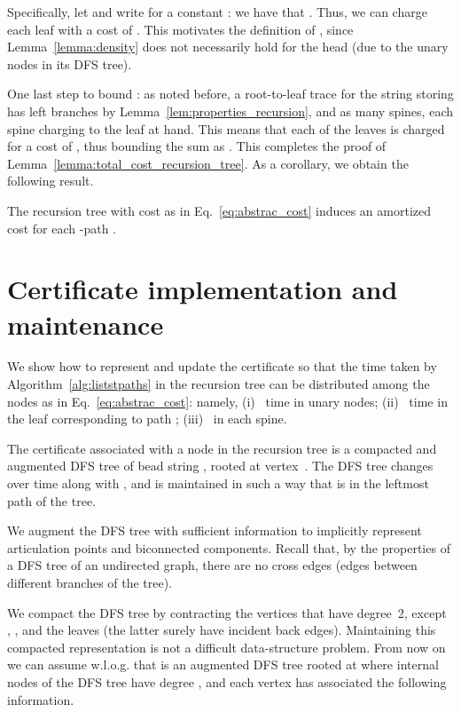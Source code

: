 Specifically, let  and write  for a constant : we have that . Thus, we can charge each
leaf with a cost of . This motivates the
definition of , since Lemma~\ref{lemma:density} does not
necessarily hold for the head  (due to the unary nodes in its
DFS tree).

One last step to bound : as noted
before, a root-to-leaf trace for the string storing  has 
left branches by Lemma~\ref{lem:properties_recursion}, and as many
spines, each spine charging  to
the leaf at hand. This means that each of the 
leaves is charged for a cost of , thus bounding the sum as
. This completes the
proof of Lemma~\ref{lemma:total_cost_recursion_tree}. As a corollary,
we obtain the following result.

\begin{lemma}
  \label{lemma:amortized_cost_per_path}
  The recursion tree  with cost as in Eq.~\eqref{eq:abstrac_cost}
  induces an  amortized cost for each -path .
\end{lemma}


\section{Certificate implementation and maintenance}
\label{sec:certificate}

We show how to represent and update the certificate  so that the
time taken by Algorithm~\ref{alg:liststpaths} in the recursion tree
can be distributed among the nodes as in Eq.~\eqref{eq:abstrac_cost}:
namely, (i)~ time in unary nodes; (ii)~ time in the
leaf corresponding to path ; (iii)~ in each
spine.

The certificate  associated with a node  in the recursion tree is a compacted and augmented DFS tree
of bead string , rooted at vertex~. The DFS tree
changes over time along with , and is
maintained in such a way that  is in the leftmost path of the tree.

We augment the DFS tree with sufficient information to implicitly
represent articulation points and biconnected components.  
Recall that, by the properties of a DFS tree of an undirected graph,
there are no cross edges (edges between different branches of the
tree).

We compact the DFS tree by contracting the vertices that have
degree~2, except , , and the leaves (the latter surely have
incident back edges). Maintaining this compacted representation is not
a difficult data-structure problem. From now on we can assume
w.l.o.g.\mbox{} that  is an augmented DFS tree rooted at  where
internal nodes of the DFS tree have degree , and each vertex
 has associated the following information.

